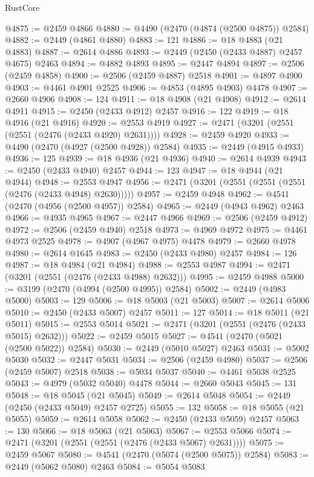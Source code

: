 \begin{lexlean}{RustCore}
\begin{coremodule}
@4875 := @2459 @4866
@4880 := @4490 (@2470 (@4874 (@2500 @4875)) @2584)
@4882 := @2449 (@4861 @4880)
@4883 := 121
@4886 := @18 @4883 (@21 @4883)
@4887 := @2614 @4886
@4893 := @2449 (@2450 (@2433 @4887) @2457 @4675) @2463
@4894 := @4882 @4893
@4895 := @2447 @4894
@4897 := @2506 (@2459 @4858)
@4900 := @2506 (@2459 @4887) @2518
@4901 := @4897 @4900
@4903 := @4461 @4901 @2525
@4906 := @4853 (@4895 @4903) @4478
@4907 := @2660 @4906
@4908 := 124
@4911 := @18 @4908 (@21 @4908)
@4912 := @2614 @4911
@4915 := @2450 (@2433 @4912) @2457
@4916 := 122
@4919 := @18 @4916 (@21 @4916)
@4920 := @2553 @4919
@4927 := @2471 (@3201 (@2551 (@2551 (@2476 (@2433 @4920) @2631))))
@4928 := @2459 @4920
@4933 := @4490 (@2470 (@4927 (@2500 @4928)) @2584)
@4935 := @2449 (@4915 @4933)
@4936 := 125
@4939 := @18 @4936 (@21 @4936)
@4940 := @2614 @4939
@4943 := @2450 (@2433 @4940) @2457
@4944 := 123
@4947 := @18 @4944 (@21 @4944)
@4948 := @2553 @4947
@4956 := @2471 (@3201 (@2551 (@2551 (@2551 (@2476 (@2433 @4948) @2630)))))
@4957 := @2459 @4948
@4962 := @4541 (@2470 (@4956 (@2500 @4957)) @2584)
@4965 := @2449 (@4943 @4962) @2463
@4966 := @4935 @4965
@4967 := @2447 @4966
@4969 := @2506 (@2459 @4912)
@4972 := @2506 (@2459 @4940) @2518
@4973 := @4969 @4972
@4975 := @4461 @4973 @2525
@4978 := @4907 (@4967 @4975) @4478
@4979 := @2660 @4978
@4980 := @2614 @1645
@4983 := @2450 (@2433 @4980) @2457
@4984 := 126
@4987 := @18 @4984 (@21 @4984)
@4988 := @2553 @4987
@4994 := @2471 (@3201 (@2551 (@2476 (@2433 @4988) @2632)))
@4995 := @2459 @4988
@5000 := @3199 (@2470 (@4994 (@2500 @4995)) @2584)
@5002 := @2449 (@4983 @5000)
@5003 := 129
@5006 := @18 @5003 (@21 @5003)
@5007 := @2614 @5006
@5010 := @2450 (@2433 @5007) @2457
@5011 := 127
@5014 := @18 @5011 (@21 @5011)
@5015 := @2553 @5014
@5021 := @2471 (@3201 (@2551 (@2476 (@2433 @5015) @2632)))
@5022 := @2459 @5015
@5027 := @4541 (@2470 (@5021 (@2500 @5022)) @2584)
@5030 := @2449 (@5010 @5027) @2463
@5031 := @5002 @5030
@5032 := @2447 @5031
@5034 := @2506 (@2459 @4980)
@5037 := @2506 (@2459 @5007) @2518
@5038 := @5034 @5037
@5040 := @4461 @5038 @2525
@5043 := @4979 (@5032 @5040) @4478
@5044 := @2660 @5043
@5045 := 131
@5048 := @18 @5045 (@21 @5045)
@5049 := @2614 @5048
@5054 := @2449 (@2450 (@2433 @5049) @2457 @2725)
@5055 := 132
@5058 := @18 @5055 (@21 @5055)
@5059 := @2614 @5058
@5062 := @2450 (@2433 @5059) @2457
@5063 := 130
@5066 := @18 @5063 (@21 @5063)
@5067 := @2553 @5066
@5074 := @2471 (@3201 (@2551 (@2551 (@2476 (@2433 @5067) @2631))))
@5075 := @2459 @5067
@5080 := @4541 (@2470 (@5074 (@2500 @5075)) @2584)
@5083 := @2449 (@5062 @5080) @2463
@5084 := @5054 @5083

\end{coremodule}
\end{lexlean}
